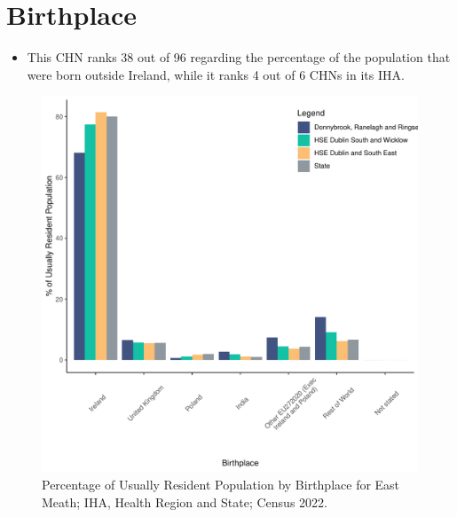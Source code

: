 \documentclass{article}
\begin{document}
\section{Birthplace}\label{sect:Birth}
\begin{itemize}
\item This CHN ranks  38 out of 96 regarding the percentage of the population that were born outside Ireland, while it ranks  4 out of 6 CHNs in its IHA.
\end{itemize}
\begin{figure}[H]
	\centering
	\includegraphics[width = 130mm]{../figures/BirthED.pdf}
	\caption{Percentage of Usually Resident Population by Birthplace for East Meath; IHA, Health Region and State; Census 2022.}
	\label{fig:vbnv}
	\end{figure}
	
\end{document}
